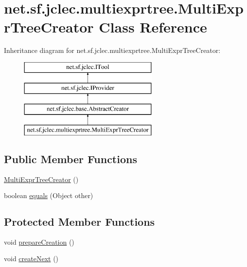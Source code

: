 \hypertarget{classnet_1_1sf_1_1jclec_1_1multiexprtree_1_1_multi_expr_tree_creator}{\section{net.\-sf.\-jclec.\-multiexprtree.\-Multi\-Expr\-Tree\-Creator Class Reference}
\label{classnet_1_1sf_1_1jclec_1_1multiexprtree_1_1_multi_expr_tree_creator}
}
Inheritance diagram for net.\-sf.\-jclec.\-multiexprtree.\-Multi\-Expr\-Tree\-Creator\-:\begin{figure}[H]
\begin{center}
\leavevmode
\includegraphics[height=4.000000cm]{classnet_1_1sf_1_1jclec_1_1multiexprtree_1_1_multi_expr_tree_creator}
\end{center}
\end{figure}
\subsection*{Public Member Functions}
\begin{DoxyCompactItemize}
\item 
\hyperlink{classnet_1_1sf_1_1jclec_1_1multiexprtree_1_1_multi_expr_tree_creator_a3af788ae08a02631c6f2e0cb24668bd4}{Multi\-Expr\-Tree\-Creator} ()
\item 
boolean \hyperlink{classnet_1_1sf_1_1jclec_1_1multiexprtree_1_1_multi_expr_tree_creator_aa24b280ae2397c3900ca5858ed629787}{equals} (Object other)
\end{DoxyCompactItemize}
\subsection*{Protected Member Functions}
\begin{DoxyCompactItemize}
\item 
void \hyperlink{classnet_1_1sf_1_1jclec_1_1multiexprtree_1_1_multi_expr_tree_creator_a6f478c0740a3c7f2452786a913e733a0}{prepare\-Creation} ()
\item 
void \hyperlink{classnet_1_1sf_1_1jclec_1_1multiexprtree_1_1_multi_expr_tree_creator_a09d421b3322dd569eed75df1785d070b}{create\-Next} ()
\end{DoxyCompactItemize}
